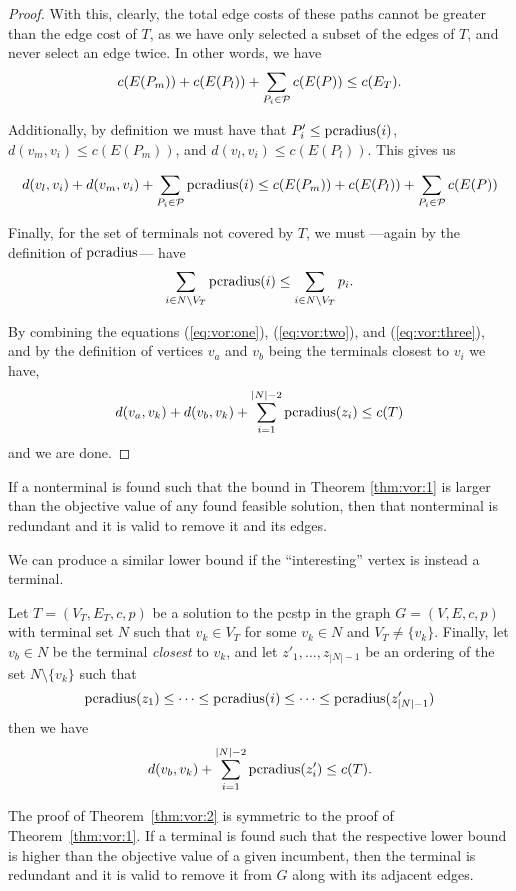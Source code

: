 \begin{proof}
With this, clearly, the total edge costs of these paths cannot be greater than the edge cost of $T$, as
we have only selected a subset of the edges of $T$, and never select an edge twice. In other words, we have
  \begin{equation}
    c(E(P_m)) + c(E(P_l)) + \sum_{P_i \in \mathcal{P}} c(E(P)) \leq c(E_T)\mathnormal{.}\label{eq:vor:one}
  \end{equation}

  
  Additionally, by definition
  we must have that $P_i' \leq \operatorname{pcradius}(i)$, $d(v_m, v_i) \leq c(E(P_m))$, and
  $d(v_l, v_i) \leq c(E(P_l))$. This gives us

  \begin{equation}
d(v_l, v_i) + d(v_m, v_i) + \sum_{P_i \in \mathcal{P}} \operatorname{pcradius}(i) \leq c(E(P_m)) + c(E(P_l)) + \sum_{P_i \in \mathcal{P}} c(E(P))\label{eq:vor:two}
\end{equation}

  Finally, for the set of terminals not covered by $T$, we must ---again by the definition of $\operatorname{pcradius}$--- have
  \begin{equation}
  \sum_{i \in N \setminus V_T} \operatorname{pcradius}(i) \leq \sum_{i \in N \setminus V_T} p_i \mathnormal{.}\label{eq:vor:three}
  \end{equation}

  By combining the equations (\ref{eq:vor:one}), (\ref{eq:vor:two}), and (\ref{eq:vor:three}), and
   by the definition of vertices $v_a$ and $v_b$ being the terminals closest to $v_i$ we have,
   $$d(v_a, v_k) + d(v_b, v_k) + \sum_{i = 1}^{|N| - 2} \operatorname{pcradius}(z_i) \leq c(T)$$
   and we are done.
 \end{proof}
 If a nonterminal is found such that the bound in Theorem \ref{thm:vor:1} is larger than the objective value of
 any found feasible solution, then that nonterminal is redundant and it is valid to remove it and its edges.

 We can produce a similar lower bound if the ``interesting'' vertex is instead a terminal.
\begin{theorem}\label{thm:vor:2}
  Let $T = (V_T, E_T, c, p)$ be a solution to the \gls{pcstp} in the graph $G = (V, E, c, p)$ with terminal set $N$ such that
  $v_k \in V_T$ for some $v_k \in N$ and $V_T \neq \{v_k\}$. Finally, let $v_b \in N$ be the terminal \textit{closest}
  to $v_k$, and let $z'_1, \ldots, z_{|N|-1}$ be an ordering of the set $N \setminus \{v_k\}$ such that
  $$\operatorname{pcradius}(z_1) \leq \cdots \leq \operatorname{pcradius}(i) \leq \cdots \leq \operatorname{pcradius}(z'_{|N|-1})$$
  then we have
  $$d(v_b, v_k) + \sum_{i = 1}^{|N| - 2} \operatorname{pcradius}(z'_i) \leq c(T)\mathnormal{.}$$
\end{theorem}
The proof of Theorem~\ref{thm:vor:2} is symmetric to the proof of Theorem~\ref{thm:vor:1}. If a terminal is found such that
the respective lower bound is higher than the objective value of a given incumbent, then the terminal is redundant and it is
 valid to remove it from $G$ along with its adjacent edges.

